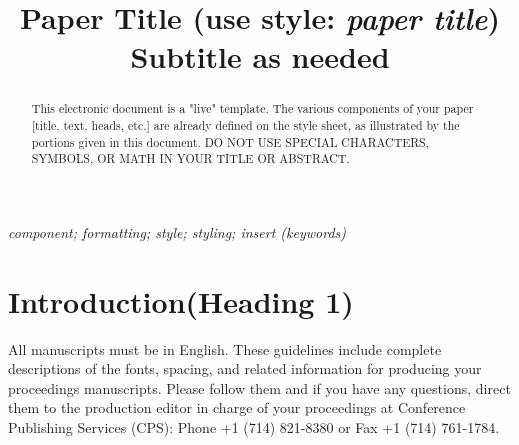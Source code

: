 \documentclass[conference]{IEEEtran}
\begin{document}
\captionsetup{labelformat=default,labelsep=space} 

\title{\vspace*{2ex} {\Large \bfseries Paper Title (use style: \textit{paper title})} \\{\large Subtitle as needed}}

\author{
	

\and


}

\maketitle

\begin{abstract}
This electronic document is a "live" template. The various components of your paper [title, text, heads, etc.] are already defined on the style sheet, as illustrated by the portions given in this document. DO NOT USE SPECIAL CHARACTERS, SYMBOLS, OR MATH IN YOUR TITLE OR ABSTRACT.\\
\end{abstract}

\begin{IEEEkeywords}
\textit{component; formatting; style; styling; insert (keywords)}
\end{IEEEkeywords}

\section{Introduction(Heading 1)} 
All manuscripts must be in English. These guidelines include complete descriptions of the fonts, spacing, and related information for producing your proceedings manuscripts. Please follow them and if you have any questions, direct them to the production editor in charge of your proceedings at Conference Publishing Services (CPS): Phone +1 (714) 821-8380 or Fax +1 (714) 761-1784.
\end{document}

